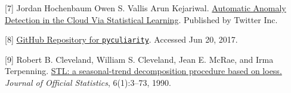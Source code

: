 \documentclass[12pt]{article}
\newcommand{\halfblankline}{\quad\vspace{-0.5\baselineskip}\pagebreak[3]}
\begin{document}
\halfblankline
 
 
[7] Jordan Hochenbaum Owen S. Vallis Arun Kejariwal. \href{https://arxiv.org/pdf/1704.07706.pdf}{Automatic Anomaly Detection in the Cloud Via Statistical Learning}. Published by Twitter Inc. 
 
\halfblankline

[8] \href{https://github.com/nicolasmiller/pyculiarity}{GitHub Repository for \texttt{pyculiarity}}. Accessed Jun 20, 2017. 

\halfblankline

[9] Robert B. Cleveland, William S. Cleveland, Jean E. McRae, and Irma Terpenning. \href{http://www.wessa.net/download/stl.pdf}{STL: a seasonal-trend decomposition procedure based on
loess.} \textit{Journal of Official Statistics}, 6(1):3–73, 1990.
\end{document}

